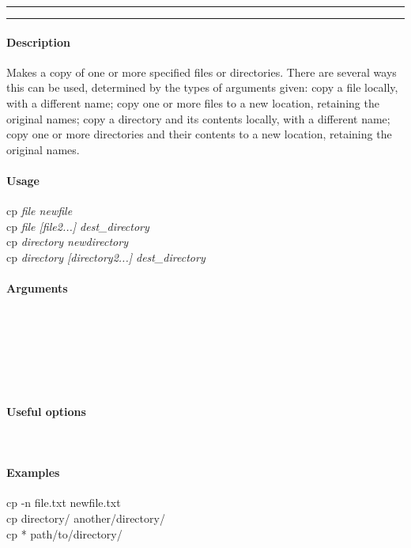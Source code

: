 \hrule
\vspace{1mm}
\hrule
\vspace{4mm}

\paragraph{Description}
\indentpar \raggedright \textrm{Makes a copy of one or more specified files or directories. There are several ways this can be used, determined by the types of arguments given: copy a file locally, with a different name; copy one or more files to a new location, retaining the original names; copy a directory and its contents locally, with a different name; copy one or more directories and their contents to a new location, retaining the original names.}\\

\paragraph{Usage}
\indentpar cp \textit{file newfile}\\
\indentpar cp \textit{file [file2...] dest\_directory}\\
\indentpar cp \textit{directory newdirectory}\\
\indentpar cp \textit{directory [directory2...] dest\_directory}

\paragraph{Arguments}
\indentpar {}\\
\indentpar {}\\
\indentpar {}\\
\indentpar {}
\indentpar {}\\
\indentpar {}\\
\indentpar {}

\paragraph{Useful options}
\indentpar {}\\


\paragraph{Examples}

\indentpar cp -n file.txt newfile.txt\\
\indentpar cp directory/ another/directory/\\
\indentpar cp * path/to/directory/\\

\vspace{20mm}
